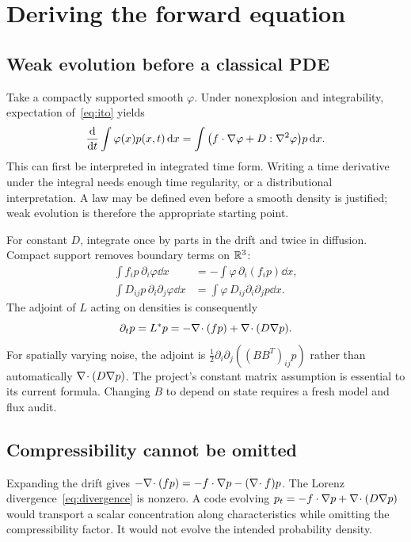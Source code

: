 \chapter{Deriving the forward equation}\label{ch:forward}
\section{Weak evolution before a classical PDE}
Take a compactly supported smooth $\varphi$. Under nonexplosion and integrability, expectation of~\eqref{eq:ito} yields
\begin{equation}\label{eq:weak-law}
\frac{\mathrm d}{\mathrm dt}\int\varphi(x)p(x,t)\,\mathrm d x
=\int\big(f\cdot\nabla\varphi+D:\nabla^2\varphi\big)p\,\mathrm d x.
\end{equation}
This can first be interpreted in integrated time form. Writing a time derivative under the integral needs enough time regularity, or a distributional interpretation. A law may be defined even before a smooth density is justified; weak evolution is therefore the appropriate starting point.

For constant $D$, integrate once by parts in the drift and twice in diffusion. Compact support removes boundary terms on $\mathbb R^3$:
\begin{align}
\int f_i p\,\partial_i\varphi\dd x&=-\int\varphi\,\partial_i(f_i p)\dd x,\\
\int D_{ij}p\,\partial_i\partial_j\varphi\dd x&=\int\varphi\,D_{ij}\partial_i\partial_jp\dd x.
\end{align}
The adjoint of $L$ acting on densities is consequently
\begin{equation}\label{eq:forward}
\partial_t p=L^*p=-\nabla\!\cdot(fp)+\nabla\!\cdot(D\nabla p).
\end{equation}
For spatially varying noise, the adjoint is $\frac12\partial_i\partial_j((BB^T)_{ij}p)$ rather than automatically $\nabla\!\cdot(D\nabla p)$. The project's constant matrix assumption is essential to its current formula. Changing $B$ to depend on state requires a fresh model and flux audit.

\section{Compressibility cannot be omitted}
Expanding the drift gives $-\nabla\!\cdot(fp)=-f\cdot\nabla p-(\nabla\!\cdot f)p$. The Lorenz divergence~\eqref{eq:divergence} is nonzero. A code evolving $p_t=-f\cdot\nabla p+\nabla\!\cdot(D\nabla p)$ would transport a scalar concentration along characteristics while omitting the compressibility factor. It would not evolve the intended probability density.

